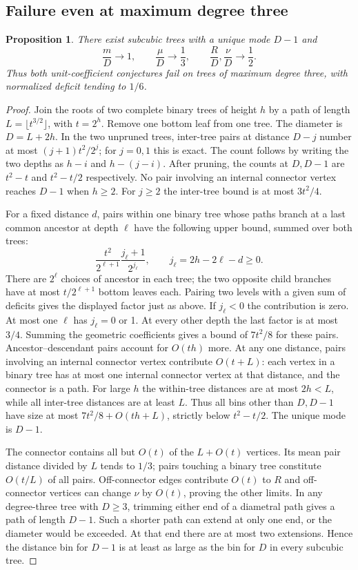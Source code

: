 \documentclass[11pt,a4paper]{article}
\newtheorem{proposition}[theorem]{Proposition}
\begin{document}
\subsection{Failure even at maximum degree three}
\begin{proposition}\label{thm:cubicmode}
There exist subcubic trees with a unique mode $D-1$ and
\[
 \frac{m}{D}\to1,\qquad \frac{\mu}{D}\to\frac13,
 \qquad \frac{R}{D},\frac{\nu}{D}\to\frac12.
\]
Thus both unit-coefficient conjectures fail on trees of maximum degree three, with normalized deficit tending to $1/6$.
\end{proposition}
\begin{proof}
Join the roots of two complete binary trees of height $h$ by a path of length $L=\lfloor t^{3/2}\rfloor$, with $t=2^h$. Remove one bottom leaf from one tree. The diameter is $D=L+2h$. In the two unpruned trees, inter-tree pairs at distance $D-j$ number at most $(j+1)t^2/2^j$; for $j=0,1$ this is exact. The count follows by writing the two depths as $h-i$ and $h-(j-i)$. After pruning, the counts at $D,D-1$ are $t^2-t$ and $t^2-t/2$ respectively. No pair involving an internal connector vertex reaches $D-1$ when $h\ge2$. For $j\ge2$ the inter-tree bound is at most $3t^2/4$.

For a fixed distance $d$, pairs within one binary tree whose paths branch at a last common ancestor at depth $\ell$ have the following upper bound, summed over both trees:
\[
  \frac{t^2}{2^{\ell+1}}\frac{j_\ell+1}{2^{j_\ell}},
  \qquad j_\ell=2h-2\ell-d\ge0.
\]
There are $2^\ell$ choices of ancestor in each tree; the two opposite child branches have at most $t/2^{\ell+1}$ bottom leaves each. Pairing two levels with a given sum of deficits gives the displayed factor just as above. If $j_\ell<0$ the contribution is zero. At most one $\ell$ has $j_\ell=0$ or 1. At every other depth the last factor is at most $3/4$. Summing the geometric coefficients gives a bound of $7t^2/8$ for these pairs. Ancestor--descendant pairs account for $O(th)$ more. At any one distance, pairs involving an internal connector vertex contribute $O(t+L)$: each vertex in a binary tree has at most one internal connector vertex at that distance, and the connector is a path. For large $h$ the within-tree distances are at most $2h<L$, while all inter-tree distances are at least $L$. Thus all bins other than $D,D-1$ have size at most $7t^2/8+O(th+L)$, strictly below $t^2-t/2$. The unique mode is $D-1$.

The connector contains all but $O(t)$ of the $L+O(t)$ vertices. Its mean pair distance divided by $L$ tends to $1/3$; pairs touching a binary tree constitute $O(t/L)$ of all pairs. Off-connector edges contribute $O(t)$ to $R$ and off-connector vertices can change $\nu$ by $O(t)$, proving the other limits. In any degree-three tree with $D\ge3$, trimming either end of a diametral path gives a path of length $D-1$. Such a shorter path can extend at only one end, or the diameter would be exceeded. At that end there are at most two extensions. Hence the distance bin for $D-1$ is at least as large as the bin for $D$ in every subcubic tree.
\end{proof}
\end{document}

